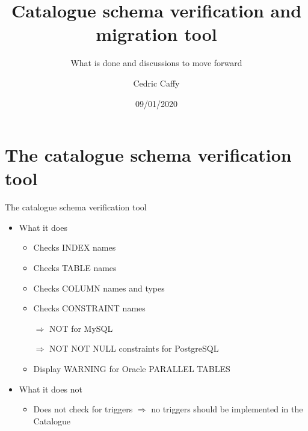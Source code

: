 \documentclass[aspectratio=149]{beamer}
\author{Cedric Caffy}
\title{Catalogue schema verification and migration tool}
\subtitle{What is done and discussions to move forward}
\date{09/01/2020}
\begin{document}
\frontcover

\frame{\titlepage}

\frame{\tableofcontents}

\section{The catalogue schema verification tool}
\begin{frame}{The catalogue schema verification tool}
  \begin{itemize}
    \item What it does
    \begin{itemize}
		\item Checks INDEX names
		\item Checks TABLE names
		\item Checks COLUMN names and types
		\item Checks CONSTRAINT names
		
		$\Rightarrow$ NOT for MySQL
		
		$\Rightarrow$ NOT NOT NULL constraints for PostgreSQL
		\item Display WARNING for Oracle PARALLEL TABLES
    \end{itemize}
    \item What it does not
    \begin{itemize}    
      \item Does not check for triggers $\Rightarrow$ no triggers should be implemented in the Catalogue
    \end{itemize}
  \end{itemize}
\end{frame}
\end{document}
